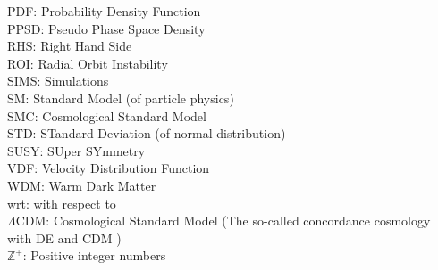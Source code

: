 PDF:             Probability Density Function \\
PPSD:            Pseudo Phase Space Density \\
RHS:             Right Hand Side \\
ROI:             Radial Orbit Instability \\
SIMS:            Simulations \\
SM:  			 Standard Model (of particle physics) \\
SMC:  		     Cosmological Standard Model \\
STD:             STandard Deviation (of normal-distribution) \\
SUSY:            SUper SYmmetry \\
VDF: 		     Velocity Distribution Function \\
WDM: 		     Warm Dark Matter \\
wrt:             with respect to \\
$\Lambda$CDM:    Cosmological Standard Model (The so-called concordance cosmology with DE and CDM ) \\
$\mathbb{Z}^+ $: Positive integer numbers \\